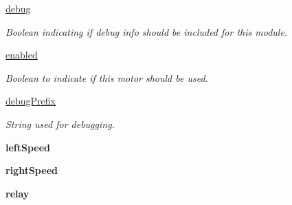 \begin{DoxyCompactItemize}
\item 
\mbox{\label{classmcs_1_1controllers_1_1DriveControl_1_1DriveControl_ac37c05e49c369bd7221028631497afb9}} 
\hyperlink{classmcs_1_1controllers_1_1DriveControl_1_1DriveControl_ac37c05e49c369bd7221028631497afb9}{debug}
\begin{DoxyCompactList}\small\item\em Boolean indicating if debug info should be included for this module. \end{DoxyCompactList}\item 
\hyperlink{classmcs_1_1controllers_1_1DriveControl_1_1DriveControl_acf7a7d6580b39a12cad0de9d2d934cca}{enabled}
\begin{DoxyCompactList}\small\item\em Boolean to indicate if this motor should be used. \end{DoxyCompactList}\item 
\mbox{\label{classmcs_1_1controllers_1_1DriveControl_1_1DriveControl_aaad780a6079f42e57ed1b4a912fd1d64}} 
\hyperlink{classmcs_1_1controllers_1_1DriveControl_1_1DriveControl_aaad780a6079f42e57ed1b4a912fd1d64}{debug\+Prefix}
\begin{DoxyCompactList}\small\item\em String used for debugging. \end{DoxyCompactList}\item 
\mbox{\label{classmcs_1_1controllers_1_1DriveControl_1_1DriveControl_ac9aa5cbe0c37e17165be998d7360c5fd}} 
{\bfseries left\+Speed}
\item 
\mbox{\label{classmcs_1_1controllers_1_1DriveControl_1_1DriveControl_a4bb5e8f8d546eec8bbe2cd92f2334a73}} 
{\bfseries right\+Speed}
\item 
\mbox{\label{classmcs_1_1controllers_1_1DriveControl_1_1DriveControl_a313c82afb9b36508968bb98349ebb56e}} 
{\bfseries relay}
\item 
\mbox{\label{classmcs_1_1controllers_1_1DriveControl_1_1DriveControl_a93da8e4cea9dbf824513968026612b64}} 

\end{DoxyCompactItemize}

